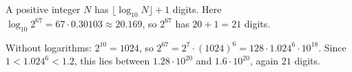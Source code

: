 A positive integer $N$ has $\lfloor\log_{10}N\rfloor+1$ digits. Here $\log_{10}2^{67}=67\cdot0.30103\approx20.169$, so $2^{67}$ has $20+1=\boxed{21}$ digits.

Without logarithms: $2^{10}=1024$, so $2^{67}=2^7\cdot(1024)^6=128\cdot 1.024^6\cdot10^{18}$. Since $1<1.024^6<1.2$, this lies between $1.28\cdot10^{20}$ and $1.6\cdot10^{20}$, again $21$ digits.
